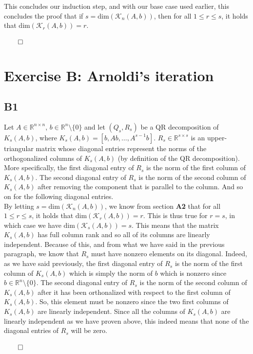 \documentclass[a4paper,10pt]{article}
\begin{document}
This concludes our induction step, and with our base case used earlier, this concludes the proof that if $s = \text{dim}(\mathcal{K}_n(A,b))$, then for all $1 \leq r \leq s$, it holds that $\text{dim}(\mathcal{K}_r(A,b)) = r$.
\begin{flushright}
    $\qed$
\end{flushright}



\section*{Exercise B: Arnoldi’s iteration}

\subsection*{B1}

Let $A \in \mathbb{R}^{n \times n}$, $b \in \mathbb{R}^n \setminus \{0\}$ and let $(Q_s,R_s)$ be a QR decomposition of $K_s(A,b)$, where $K_s(A,b) = [b,Ab,\dots,A^{s-1}b]$. $R_s \in \mathbb{R}^{s \times s}$ is an upper-triangular matrix whose diagonal entries represent the norms of the orthogonalized columns of $K_s(A,b)$ (by definition of the QR decomposition). More specifically, the first diagonal entry of $R_s$ is the norm of the first column of $K_s(A,b)$. The second diagonal entry of $R_s$ is the norm of the second column of $K_s(A,b)$ after removing the component that is parallel to the column. And so on for the following diagonal entries. \\

By letting $s = \text{dim}(\mathcal{K}_n(A,b))$, we know from section \textbf{A2} that for all $1 \leq r \leq s$, it holds that $\text{dim}(\mathcal{K}_r(A,b)) = r$. This is thus true for $r = s$, in which case we have $\text{dim}(\mathcal{K}_s(A,b)) = s$. This means that the matrix $K_s(A,b)$ has full column rank and so all of its columns are linearly independent. Because of this, and from what we have said in the previous paragraph, we know that $R_s$ must have nonzero elements on its diagonal. Indeed, as we have said previously, the first diagonal entry of $R_s$ is the norm of the first column of $K_s(A,b)$ which is simply the norm of $b$ which is nonzero since $b \in \mathbb{R}^n \setminus \{0\}$. The second diagonal entry of $R_s$ is the norm of the second column of $K_s(A,b)$ after it has been orthonalized with respect to the first column of $K_s(A,b)$. So, this element must be nonzero since the two first columns of $K_s(A,b)$ are linearly independent. Since all the columns of $K_s(A,b)$ are linearly independent as we have proven above, this indeed means that none of the diagonal entries of $R_s$ will be zero. 
\begin{flushright}
    $\qed$
\end{flushright}
\end{document}
